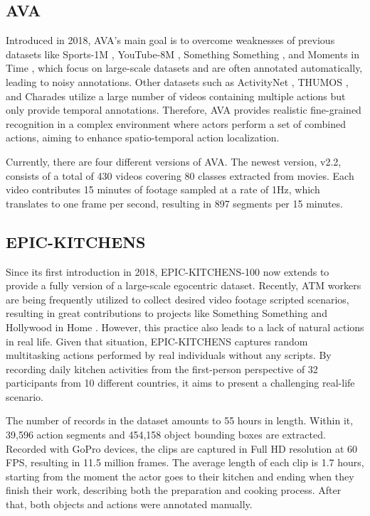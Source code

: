 \documentclass[a4paper]{article}
\begin{document}
\subsection{AVA}
Introduced in 2018, AVA's \cite{AVA} main goal is to overcome weaknesses of previous datasets like Sports-1M \cite{Sports1M}, YouTube-8M \cite{YouTube8M}, Something Something \cite{SomethingV1}, and Moments in Time \cite{MomentsinTime}, which focus on large-scale datasets and are often annotated automatically, leading to noisy annotations. Other datasets such as ActivityNet \cite{ActivityNet}, THUMOS \cite{THUMOS}, and Charades utilize a large number of videos containing multiple actions but only provide temporal annotations. Therefore, AVA provides realistic fine-grained recognition in a complex environment where actors perform a set of combined actions, aiming to enhance spatio-temporal action localization.

Currently, there are four different versions of AVA. The newest version, v2.2, consists of a total of 430 videos covering 80 classes extracted from movies. Each video contributes 15 minutes of footage sampled at a rate of 1Hz, which translates to one frame per second, resulting in 897 segments per 15 minutes.

\subsection{EPIC-KITCHENS}
Since its first introduction in 2018, EPIC-KITCHENS-100 \cite{EPIC-KITCHENS} now extends to provide a fully version of a large-scale egocentric dataset. Recently, ATM workers are being frequently utilized to collect desired video footage scripted scenarios, resulting in great contributions to projects like Something Something \cite{SomethingV1} and Hollywood in Home \cite{Charades}. However, this practice also leads to a lack of natural actions in real life. Given that situation, EPIC-KITCHENS captures random multitasking actions performed by real individuals without any scripts. By recording daily kitchen activities from the first-person perspective of 32 participants from 10 different countries, it aims to present a challenging real-life scenario.

The number of records in the dataset amounts to 55 hours in length. Within it, 39,596 action segments and 454,158 object bounding boxes are extracted. Recorded with GoPro devices, the clips are captured in Full HD resolution at 60 FPS, resulting in 11.5 million frames. The average length of each clip is 1.7 hours, starting from the moment the actor goes to their kitchen and ending when they finish their work, describing both the preparation and cooking process. After that, both objects and actions were annotated manually.
\end{document}
